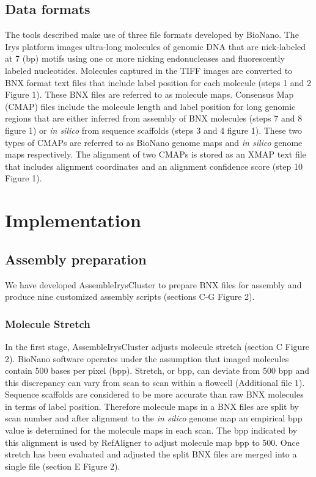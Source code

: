 \documentclass{bmcart}
\begin{document}
\subsection*{Data formats}
The tools described make use of three file formats developed by BioNano. The Irys platform images ultra-long molecules of genomic DNA that are nick-labeled at 7 (bp) motifs using one or more nicking endonucleases and fluorescently labeled nucleotides. Molecules captured in the TIFF images are converted to BNX format text files that include label position for each molecule (steps 1 and 2 Figure 1). These BNX files are referred to as molecule maps. Consensus Map (CMAP) files include the molecule length and label position for long genomic regions that are either inferred from assembly of BNX molecules (steps 7 and 8 figure 1) or \textit{in silico} from sequence scaffolds (steps 3 and 4 figure 1). These two types of CMAPs are referred to as BioNano genome maps and \textit{in silico} genome maps respectively. The alignment of two CMAPs is stored as an XMAP text file that includes alignment coordinates and an alignment confidence score (step 10 Figure 1).

\section*{Implementation}
\subsection*{Assembly preparation}
We have developed AssembleIrysCluster to prepare BNX files for assembly and produce nine customized assembly scripts (sections C-G Figure 2).
\subsubsection*{Molecule Stretch}
In the first stage, AssembleIrysCluster adjusts molecule stretch (section C Figure 2). BioNano software operates under the assumption that imaged molecules contain 500 bases per pixel (bpp). Stretch, or bpp, can deviate from 500 bpp and this discrepancy can vary from scan to scan within a flowcell (Additional file 1). Sequence scaffolds are considered to be more accurate than raw BNX molecules in terms of label position. Therefore molecule maps in a BNX files are split by scan number and after alignment to the \textit{in silico} genome map an empirical bpp value is determined for the molecule maps in each scan. The bpp indicated by this alignment is used by RefAligner to adjust molecule map bpp to 500. Once stretch has been evaluated and adjusted the split BNX files are merged into a single file (section E Figure 2).
\end{document}
